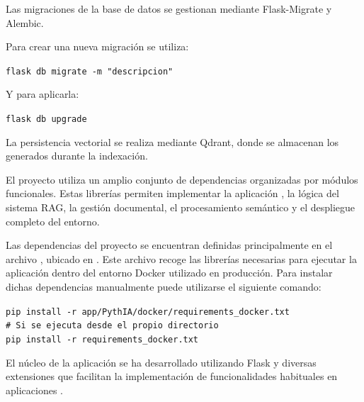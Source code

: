 Las migraciones de la base de datos se gestionan mediante Flask-Migrate y Alembic.

Para crear una nueva migración se utiliza:

\begin{tcolorbox}[
	colback=black!3,
	colframe=black!30,
	boxrule=0.5pt,
	arc=2mm,
	title= Terminal,
	fonttitle=\bfseries,
	breakable
]
	{\footnotesize
		\noindent
		\texttt{flask db migrate -m "descripcion"}
	}
\end{tcolorbox}

Y para aplicarla:

\begin{tcolorbox}[
	colback=black!3,
	colframe=black!30,
	boxrule=0.5pt,
	arc=2mm,
	title= Terminal,
	fonttitle=\bfseries,
	breakable
]
	{\footnotesize
		\noindent
		\texttt{flask db upgrade}
	}
\end{tcolorbox}

La persistencia vectorial se realiza mediante Qdrant, donde se almacenan los  generados durante la indexación.

El proyecto utiliza un amplio conjunto de dependencias organizadas por módulos funcionales. Estas librerías permiten implementar la aplicación , la lógica del sistema RAG, la gestión documental, el procesamiento semántico y el despliegue completo del entorno.

Las dependencias del proyecto se encuentran definidas principalmente en el archivo , ubicado en . Este archivo recoge las librerías necesarias para ejecutar la aplicación dentro del entorno Docker utilizado en producción. Para instalar dichas dependencias manualmente puede utilizarse el siguiente comando:

\begin{tcolorbox}[
	colback=black!3,
	colframe=black!30,
	boxrule=0.5pt,
	arc=2mm,
	title= Terminal,
	fonttitle=\bfseries,
	breakable
]
	{\footnotesize
		\noindent	
	\texttt{pip install -r app/PythIA/docker/requirements\_docker.txt}\\
	\texttt{\#  Si se ejecuta desde el propio directorio}\\
	\texttt{pip install -r requirements\_docker.txt}
	}
\end{tcolorbox}

El núcleo de la aplicación se ha desarrollado utilizando Flask y diversas extensiones que facilitan la implementación de funcionalidades habituales en aplicaciones .

